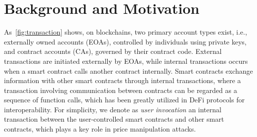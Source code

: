 \section{Background and Motivation}
\label{sec:background}





As~\myfig\ref{fig:transaction} shows,
on blockchains, two primary account types exist, i.e., externally owned accounts (EOAs), controlled by individuals using private keys, and contract accounts (CAs), governed by their contract code. 
External transactions are initiated externally by EOAs, while internal transactions occurs when a smart contract calls another contract internally. 
Smart contracts exchange information with other smart contracts through internal transactions, where
a transaction involving communication between contracts can be regarded as a sequence of function calls, which has been greatly utilized in DeFi protocols for interoperability.
For simplicity, we denote as \emph{user invocation} an internal transaction between the user-controlled smart contracts and other smart contracts, which plays a key role in price manipulation attacks.





